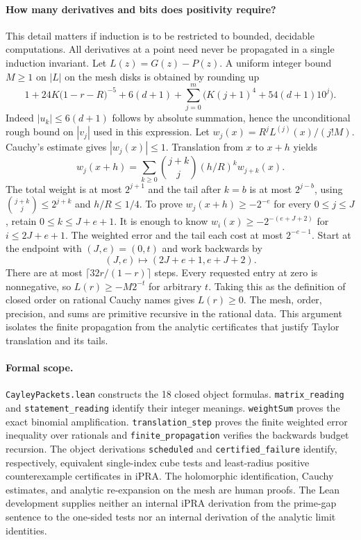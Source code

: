 \paragraph{How many derivatives and bits does positivity require?}
This detail matters if induction is to be restricted to bounded,
decidable computations. All derivatives at a point need never be
propagated in a single induction invariant. Let $L(z)=G(z)-P(z)$.
A uniform integer bound $M\ge1$ on $|L|$ on the mesh disks is obtained
by rounding up
\[
 1+24K\bigl(1-r-R\bigr)^{-5}+6(d+1)
       +\sum_{j=0}^m \bigl(K(j+1)^4+54(d+1)10^j\bigr).
\]
Indeed $|u_k|\le6(d+1)$ follows by absolute summation, hence the
unconditional rough bound on $|v_j|$ used in this expression.
Let $w_j(x)=R^j L^{(j)}(x)/(j!M)$. Cauchy's estimate gives
$|w_j(x)|\le1$. Translation from $x$ to $x+h$ yields
\[
 w_j(x+h)=\sum_{k\ge0}\binom{j+k}{j}(h/R)^k w_{j+k}(x).
\]
The total weight is at most $2^{j+1}$ and the tail after $k=b$ is at most
$2^{j-b}$, using $\binom{j+k}{j}\le2^{j+k}$ and $h/R\le1/4$.
To prove $w_j(x+h)\ge-2^{-e}$ for every $0\le j\le J$, retain
$0\le k\le J+e+1$. It is enough to know
$w_i(x)\ge-2^{-(e+J+2)}$ for $i\le2J+e+1$. The weighted error
and the tail each cost at most $2^{-e-1}$. Start at the endpoint with
$(J,e)=(0,t)$ and work backwards by
\[
             (J,e)\longmapsto(2J+e+1,e+J+2).
\]
There are at most $\lceil32r/(1-r)\rceil$ steps. Every requested
entry at zero is nonnegative, so $L(r)\ge-M2^{-t}$ for arbitrary
$t$. Taking this as the definition of closed order on rational Cauchy
names gives $L(r)\ge0$. The mesh, order, precision, and sums are
primitive recursive in the rational data. This argument isolates the
finite propagation from the analytic certificates that justify Taylor
translation and its tails.

\paragraph{Formal scope.}
\texttt{CayleyPackets.lean} constructs the 18 closed object formulas.
\texttt{matrix\_reading} and \texttt{statement\_reading} identify their
integer meanings. \texttt{weightSum} proves the exact binomial amplification.
\texttt{translation\_step} proves the finite weighted error inequality over
rationals and \texttt{finite\_propagation} verifies the backwards budget
recursion. The object derivations \texttt{scheduled} and
\texttt{certified\_failure} identify, respectively, equivalent single-index
cube tests and least-radius positive counterexample certificates in iPRA.
The holomorphic identification, Cauchy estimates, and analytic re-expansion
on the mesh are human proofs. The Lean development supplies neither an
internal iPRA derivation from the prime-gap sentence to the one-sided tests
nor an internal derivation of the analytic limit identities.
